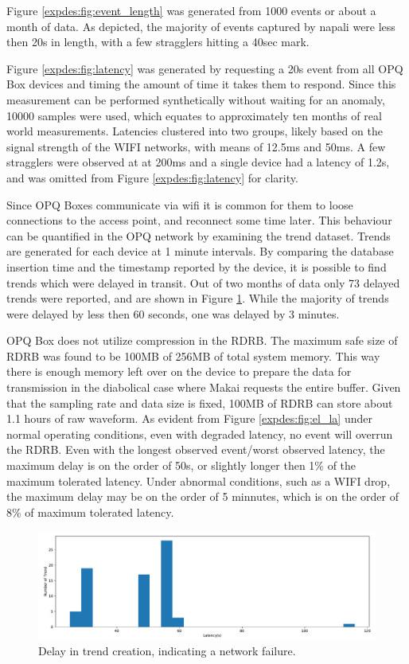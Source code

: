 Figure \ref{expdes:fig:event_length} was generated from 1000 events or about a month of data.
As depicted, the majority of events captured by napali were less then 20s in length, with a few stragglers hitting a 40sec mark.

Figure \ref{expdes:fig:latency} was generated by requesting a 20s event from all OPQ Box devices and timing the amount of time it takes them to respond.
Since this measurement can be performed synthetically without waiting for an anomaly, 10000 samples were used, which equates to approximately ten months of real world measurements.
Latencies clustered into two groups, likely based on the signal strength of the WIFI networks, with means of 12.5ms and 50ms.
A few stragglers were observed at at 200ms and a single device had a latency of 1.2s, and was omitted from Figure \ref{expdes:fig:latency} for clarity.

Since OPQ Boxes communicate via wifi it is common for them to loose connections to the access point, and reconnect some time later.
This behaviour can be quantified in the OPQ network by examining the trend dataset.
Trends are generated for each device at 1 minute intervals.
By comparing the database insertion time and the timestamp reported by the device, it is possible to find trends which were delayed in transit.
Out of two months of data only 73 delayed trends were reported, and are shown in Figure \ref{expdes:fig:trend_latency}.
While the majority of trends were delayed by less then 60 seconds, one was delayed by 3 minutes.

OPQ Box does not utilize compression in the RDRB.
The maximum safe size of RDRB was found to be 100MB of 256MB of total system memory.
This way there is enough memory left over on the device to prepare the data for transmission in the diabolical case where Makai requests the entire buffer.
Given that the sampling rate and data size is fixed, 100MB of RDRB can store about 1.1 hours of raw waveform.
As evident from Figure \ref{expdes:fig:el_la} under normal operating conditions, even with degraded latency, no event will overrun the RDRB.
Even with the longest observed event/worst observed latency, the maximum delay is on the order of 50s, or slightly longer then 1\% of the maximum tolerated latency.
Under abnormal conditions, such as a WIFI drop, the maximum delay may be on the order of 5 minnutes, which is on the order of 8\% of maximum tolerated latency.

\begin{figure}[ht!]
    \centering
    \includegraphics[width=1\linewidth]{img/napali_eval/trend_latency.pdf}
    \caption{Delay in trend creation, indicating a network failure.}
    \label{expdes:fig:trend_latency}
\end{figure}


